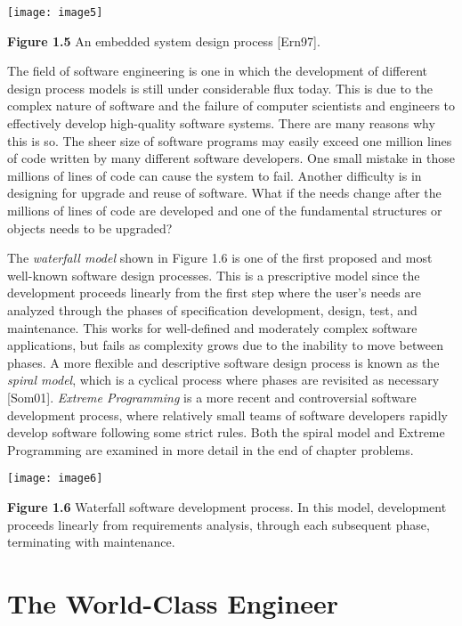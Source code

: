 \texttt{[image: image5]}

\textbf{Figure 1.5} An embedded system design process {[}Ern97{]}.

The field of software engineering is one in which the development of
different design process models is still under considerable flux today.
This is due to the complex nature of software and the failure of
computer scientists and engineers to effectively develop high-quality
software systems. There are many reasons why this is so. The sheer size
of software programs may easily exceed one million lines of code written
by many different software developers. One small mistake in those
millions of lines of code can cause the system to fail. Another
difficulty is in designing for upgrade and reuse of software. What if
the needs change after the millions of lines of code are developed and
one of the fundamental structures or objects needs to be upgraded?

The \emph{waterfall model} shown in Figure 1.6 is one of the first
proposed and most well-known software design processes. This is a
prescriptive model since the development proceeds linearly from the
first step where the user's needs are analyzed through the phases of
specification development, design, test, and maintenance. This works for
well-defined and moderately complex software applications, but fails as
complexity grows due to the inability to move between phases. A more
flexible and descriptive software design process is known as the
\emph{spiral model}, which is a cyclical process where phases are
revisited as necessary {[}Som01{]}. \emph{Extreme Programming} is a more
recent and controversial software development process, where relatively
small teams of software developers rapidly develop software following
some strict rules. Both the spiral model and Extreme Programming are
examined in more detail in the end of chapter problems.

 \texttt{[image: image6]}

\textbf{Figure 1.6} Waterfall software development process. In this
model, development proceeds linearly from requirements analysis, through
each subsequent phase, terminating with maintenance.

\section{The World-Class Engineer}\label{the-world-class-engineer}

